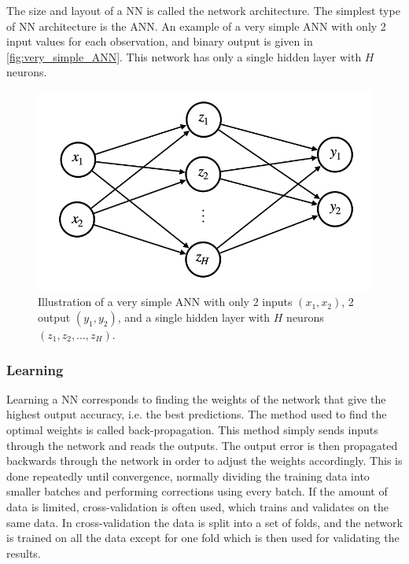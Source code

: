 The size and layout of a NN is called the network architecture. The simplest type of NN architecture is the ANN. An example of a very simple ANN with only 2 input values for each observation, and binary output is given in \autoref{fig:very_simple_ANN}. This network has only a single hidden layer with $H$ neurons. 
\begin{figure}
    \centering
    \captionsetup{width=.95\linewidth}
    \includegraphics[width=.6\linewidth]{Pics/02_Theory/simple_ANN.png}
    \caption{Illustration of a very simple ANN with only 2 inputs $(x_1, x_2)$, 2 output $(y_1, y_2)$, and a single hidden layer with $H$ neurons $(z_1, z_2,\dots ,z_H)$.}
    \label{fig:very_simple_ANN}
\end{figure}

\subsubsection{Learning}
Learning a NN corresponds to finding the weights of the network that give the highest output accuracy, i.e. the best predictions. The method used to find the optimal weights is called back-propagation. This method simply sends inputs through the network and reads the outputs. The output error is then propagated backwards through the network in order to adjust the weights accordingly. This is done repeatedly until convergence, normally dividing the training data into smaller batches and performing corrections using every batch. If the amount of data is limited, cross-validation is often used, which trains and validates on the same data. In cross-validation the data is split into a set of folds, and the network is trained on all the data except for one fold which is then used for validating the results.

